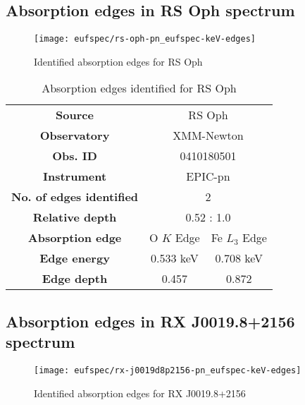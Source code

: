		
		\newpage
		\subsection*{Absorption edges in RS Oph spectrum}
			\begin{figure}[h!]
				\centering
				\texttt{[image: eufspec/rs-oph-pn\_eufspec-keV-edges]}
				\caption{Identified absorption edges for RS Oph}
				\label{result:absedge-rs-oph}
			\end{figure}
			
			\renewcommand{\arraystretch}{1.5}
			\begin{table}[!htb]
				\centering
				\caption{Absorption edges identified for RS Oph}
				\label{tab:absedge-rs-oph}
				\begin{tabular}{ccc}
					\hline
					\textbf{Source} & \multicolumn{2}{c}{RS Oph} \\
					\textbf{Observatory} & \multicolumn{2}{c}{XMM-Newton} \\
					\textbf{Obs. ID} & \multicolumn{2}{c}{0410180501} \\
					\textbf{Instrument} & \multicolumn{2}{c}{EPIC-pn} \\
					\textbf{No. of edges identified} & \multicolumn{2}{c}{2} \\
					\textbf{Relative depth} & \multicolumn{2}{c}{0.52 : 1.0} \\
					\hline
					\textbf{Absorption edge} & {O $K$ Edge} & {Fe $L_3$ Edge} \\
					\textbf{Edge energy} & {0.533 keV} & {0.708 keV} \\
					\textbf{Edge depth} & {0.457} & {0.872} \\ \hline
				\end{tabular}
			\end{table}
			\renewcommand{\arraystretch}{2.2}
		
		\newpage
		\subsection*{Absorption edges in RX J0019.8+2156 spectrum}
			\begin{figure}[h!]
				\centering
				\texttt{[image: eufspec/rx-j0019d8p2156-pn\_eufspec-keV-edges]}
				\caption{Identified absorption edges for RX J0019.8+2156}
				\label{result:absedge-rx-j0019}
			\end{figure}
			
